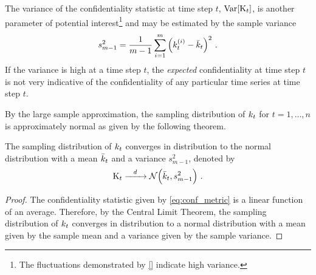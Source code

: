 \documentclass[ ../main.tex]{subfiles}
\begin{document}
The variance of the confidentiality statistic at time step $t$, $\operatorname{\rm{Var}}[\mathrm{K}_t]$, is another parameter of potential interest\footnote{The fluctuations demonstrated by \cref{} indicate high variance.} and may be estimated by the sample variance
\begin{equation}
    s_{m-1}^2 = \frac{1}{m-1} \sum_{i=1}^{m} \left(k_t^{(i)} - \bar{k}_t\right)^2\,.
\end{equation}
If the variance is high at a time step $t$, the \emph{expected} confidentiality at time step $t$ is not very indicative of the confidentiality of any particular time series at time step $t$.

By the large sample approximation, the sampling distribution of $k_t$ for $t=1,\ldots,n$ is approximately normal as given by the following theorem.
\begin{theorem}
\label{thm:normal}
The sampling distribution of $k_t$ converges in distribution to the normal distribution with a mean $\bar{k}_t$ and a variance $s_{m-1}^2$, denoted by
\begin{equation}
    \VarConf_t \dconverges{d} \mathcal{N}\!\left(\bar{\Conf}_t, s_{m-1}^2\right)\,.
\end{equation}
\end{theorem}
\begin{proof}
The confidentiality statistic given by \cref{eq:conf_metric} is a linear function of an average. Therefore, by the Central Limit Theorem, the sampling distribution of $k_t$ converges in distribution to a normal distribution with a mean given by the sample mean and a variance given by the sample variance.
\end{proof}
\end{document}
